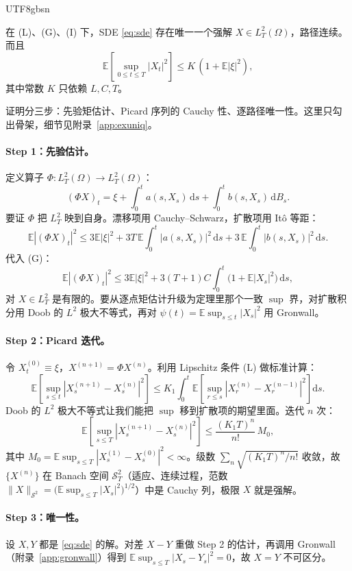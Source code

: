 \documentclass{article}
\theoremstyle{plain}
\theoremstyle{definition}
\begin{document}
\begin{CJK*}{UTF8}{gbsn}
\begin{theorem}[强解的存在与唯一]\label{thm:exuniq}
在 (L)、(G)、(I) 下，SDE \eqref{eq:sde} 存在唯一一个强解 $X\in L^2_T(\Omega)$，路径连续。而且
\[
  \mathbb{E}\!\left[\sup_{0\le t\le T}|X_t|^2\right]\le K\,(1+\mathbb{E}|\xi|^2),
\]
其中常数 $K$ 只依赖 $L,C,T$。
\end{theorem}

证明分三步：先验矩估计、Picard 序列的 Cauchy 性、逐路径唯一性。这里只勾出骨架，细节见附录~\ref{app:exuniq}。

\paragraph{Step 1：先验估计。} 定义算子 $\Phi:L^2_T(\Omega)\to L^2_T(\Omega)$：
\[
  (\Phi X)_t=\xi+\int_0^t a(s,X_s)\,\mathrm{d}s+\int_0^t b(s,X_s)\,\mathrm{d}B_s.
\]
要证 $\Phi$ 把 $L^2_T$ 映到自身。漂移项用 Cauchy--Schwarz，扩散项用 It\^o 等距：
\[
  \mathbb{E}|(\Phi X)_t|^2\le 3\mathbb{E}|\xi|^2+3T\,\mathbb{E}\!\int_0^t|a(s,X_s)|^2\,\mathrm{d}s+3\,\mathbb{E}\!\int_0^t|b(s,X_s)|^2\,\mathrm{d}s.
\]
代入 (G)：
\[
  \mathbb{E}|(\Phi X)_t|^2\le 3\mathbb{E}|\xi|^2+3(T+1)C\!\int_0^t\!\bigl(1+\mathbb{E}|X_s|^2\bigr)\,\mathrm{d}s,
\]
对 $X\in L^2_T$ 是有限的。要从逐点矩估计升级为定理里那个一致 $\sup$ 界，对扩散积分用 Doob 的 $L^2$ 极大不等式，再对 $\psi(t)=\mathbb{E}\sup_{s\le t}|X_s|^2$ 用 Gronwall。

\paragraph{Step 2：Picard 迭代。} 令 $X^{(0)}_t\equiv\xi$，$X^{(n+1)}=\Phi X^{(n)}$。利用 Lipschitz 条件 (L) 做标准计算：
\[
  \mathbb{E}\!\left[\sup_{s\le t}|X^{(n+1)}_s-X^{(n)}_s|^2\right]\le K_1\!\int_0^t\mathbb{E}\!\left[\sup_{r\le s}|X^{(n)}_r-X^{(n-1)}_r|^2\right]\mathrm{d}s.
\]
Doob 的 $L^2$ 极大不等式让我们能把 $\sup$ 移到扩散项的期望里面。迭代 $n$ 次：
\[
  \mathbb{E}\!\left[\sup_{s\le T}|X^{(n+1)}_s-X^{(n)}_s|^2\right]\le \frac{(K_1 T)^n}{n!}\,M_0,
\]
其中 $M_0=\mathbb{E}\sup_{s\le T}|X^{(1)}_s-X^{(0)}_s|^2<\infty$。级数 $\sum_n \sqrt{(K_1T)^n/n!}$ 收敛，故 $\{X^{(n)}\}$ 在 Banach 空间 $\mathcal{S}^2_T$（适应、连续过程，范数 $\|X\|_{\mathcal{S}^2}=\bigl(\mathbb{E}\sup_{s\le T}|X_s|^2\bigr)^{1/2}$）中是 Cauchy 列，极限 $X$ 就是强解。

\paragraph{Step 3：唯一性。} 设 $X,Y$ 都是 \eqref{eq:sde} 的解。对差 $X-Y$ 重做 Step 2 的估计，再调用 Gronwall（附录~\ref{app:gronwall}）得到 $\mathbb{E}\sup_{s\le T}|X_s-Y_s|^2=0$，故 $X=Y$ 不可区分。


\end{CJK*}
\end{document}
